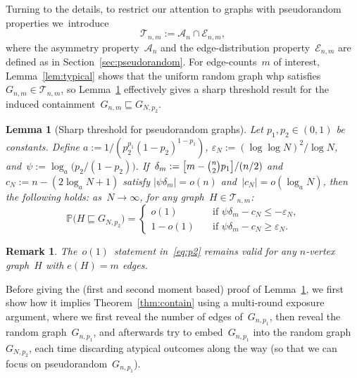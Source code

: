 \documentclass{article}
\newcommand{\eps}{\varepsilon}
\renewcommand{\Pr}{\mathbb{P}}
\newcommand{\cA}{\mathcal{A}}
\newcommand{\cE}{\mathcal{E}}
\newcommand{\cT}{\mathcal{T}}
\newcommand\abs[1]{\left|#1\right|}
\newcommand{\isub}{\sqsubseteq}
\newtheorem{lemma}[thm]{Lemma}
\newtheorem{remark}{Remark}
\newcommand\bigpar[1]{\bigl(#1\bigr)}
\newcommand\bigsqpar[1]{\bigl[#1\bigr]}
\newcommand{\refT}[1]{Theorem~\ref{#1}}
\newcommand{\refL}[1]{Lemma~\ref{#1}}
\newcommand{\refS}[1]{Section~\ref{#1}}
\begin{document}
Turning to the details, to restrict our attention to graphs with pseudorandom properties 
we~introduce
\begin{equation}\label{def:Tnm}
\cT_{n,m} := \cA_n \cap \cE_{n,m},
\end{equation}
where the asymmetry property~$\cA_n$ and the edge-distribution property~$\cE_{n,m}$ are defined as in \refS{sec:pseudorandom}. 
For edge-counts~$m$ of interest, 
\refL{lem:typical} shows that the uniform random graph whp satisfies~$G_{n,m} \in \cT_{n,m}$, 
so \refL{lem:maincontain}  effectively gives a sharp threshold result for the induced containment~$G_{n,m} \isub G_{N,p_2}$. 
\begin{lemma}[Sharp threshold for pseudorandom graphs]\label{lem:maincontain}
Let $p_1,p_2\in (0,1)$ be constants.
Define $a := {1/(p_2^{p_1}(1-p_2)^{1-p_1})}$, $\eps_N:={(\log \log N)^2/\log N}$, and~$\psi:={\log_a\bigpar{p_2/(1-p_2)}}$.
If~$\delta_m := {\bigsqpar{m-\tbinom{n}{2}p_1}/(n/2)}$ 
and~$c_N:={n-(2\log_a N + 1)}$
satisfy ${\abs{\psi \delta_m} = o(n)}$ and~${\abs{c_N} = o(\log_a N)}$, then the following holds: as~$N \to \infty$, for any graph~$H \in \cT_{n,m}$:
 \begin{equation}\label{eq:p2}
\Pr\bigpar{H\isub G_{N,p_2}} = \begin{cases} o(1) \quad & \text{if~$\psi \delta_m-c_N \le -\eps_N$,}\\ 
1-o(1) \quad & \text{if~$\psi \delta_m-c_N \ge \eps_N$.}\end{cases}
\end{equation}
\end{lemma}
\begin{remark}\label{rem:0-statement}
The~\mbox{$o(1)$ statement} in~\eqref{eq:p2} remains valid for any $n$-vertex graph~$H$ with $e(H)=m$ edges. 
\end{remark}
Before giving the (first and second moment based) proof of \refL{lem:maincontain}, we first show how it implies \refT{thm:contain} using a multi-round exposure argument, where we first reveal the number of edges of~$G_{n,p_1}$, 
then reveal the random graph~$G_{n,p_1}$, and afterwards try to embed~$G_{n,p_1}$ into the random graph~$G_{N,p_2}$, each time discarding atypical outcomes along the way (so that we can focus on pseudorandom~$G_{n,p_1}$). 
\end{document}

